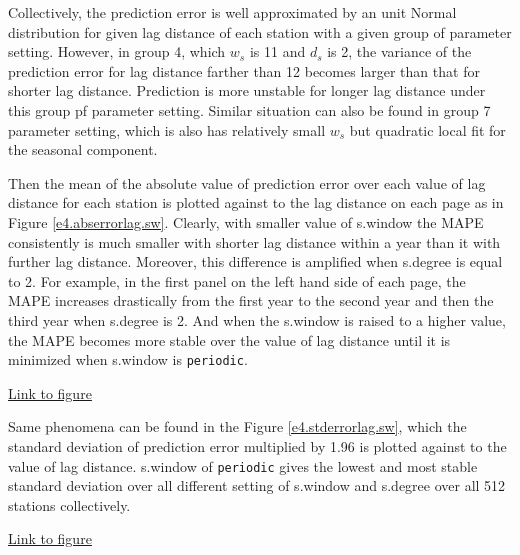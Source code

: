 Collectively, the prediction error is well approximated by an unit Normal
distribution for given lag distance of each station with a given group of
parameter setting. However, in group 4, which $w_s$ is 11 and $d_s$ is 2, the 
variance of the prediction error for lag distance farther than 12 becomes larger
than that for shorter lag distance. Prediction is more unstable for longer lag
distance under this group pf parameter setting. Similar situation can also be
found in group 7 parameter setting, which is also has relatively small $w_s$ but
quadratic local fit for the seasonal component.

Then the mean of the absolute value of prediction error over each value of lag
distance for each station is plotted against to the lag distance on each page as
in Figure \href{../plots/a1950/E4/tmax.absmeans.vs.lag.sw.pdf}
{\ref*{e4.abserrorlag.sw}}. Clearly, with smaller value of s.window the MAPE 
consistently is much smaller with shorter lag distance within a year than it with
further lag distance. Moreover, this difference is amplified when s.degree is 
equal to 2. For example, 
in the first panel on the left hand side of each page, the MAPE increases 
drastically from the first year to the second year and then the third year when
s.degree is 2. And when the s.window is raised to a higher value, the MAPE 
becomes more stable over the value of lag distance until it is minimized when 
s.window is \texttt{periodic}.

\begin{framed}
\begin{center}
  \href{../plots/a1950/E4/tmax.absmeans.vs.lag.sw.pdf}{Link to figure}
  \label{e4.abserrorlag.sw}
\end{center}
\end{framed}

Same phenomena can be found in the Figure 
\href{../plots/a1950/E4/tmax.std.vs.lag.sw.pdf}{\ref*{e4.stderrorlag.sw}}, which 
the standard deviation of prediction error multiplied by 1.96 is plotted against
to the value of lag distance. s.window of \texttt{periodic} gives the 
lowest and most stable standard deviation over all different setting of s.window
and s.degree over all 512 stations collectively. 

\begin{framed}
\begin{center}
  \href{../plots/a1950/E4/tmax.std.vs.lag.sw.pdf}{Link to figure}
  \label{e4.stderrorlag.sw}
\end{center}
\end{framed}

